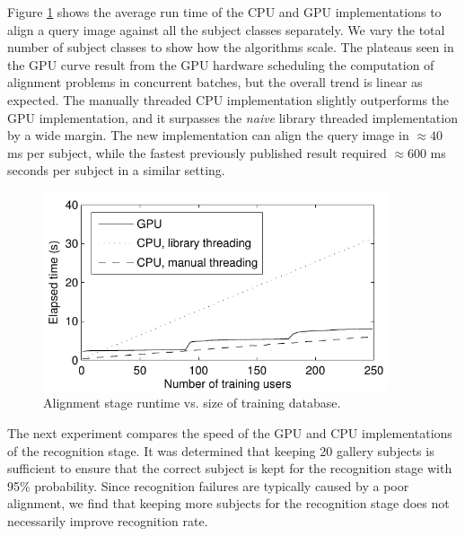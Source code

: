 Figure \ref{fig:alignment_stage_runtime} shows the average run time of the CPU and GPU implementations to align
a query image against all the subject classes separately. We vary the total number of
subject classes to show how the algorithms scale. The plateaus seen in the GPU curve
result from the GPU hardware scheduling the computation of alignment
problems in concurrent batches, but the overall trend is linear as expected.
The manually threaded CPU implementation slightly outperforms the GPU implementation,
and it surpasses the \emph{naive}
library threaded implementation by a wide margin.
The new implementation can align the query
image in $\approx 40$ ms per subject, 
while the fastest previously published result \cite{WagnerA2011-PAMI}
required $\approx 600$ ms seconds per subject in a similar setting.  

\begin{figure}[t!]
\centering
\includegraphics[width=4in]{figures_ijcb/alignment_runtime_graph.pdf}
\caption{Alignment stage runtime vs. size of training database.} 
\label{fig:alignment_stage_runtime}
\end{figure}

The next experiment compares the speed of the GPU and CPU implementations of
the recognition stage.  It was determined that keeping 20 gallery subjects is
sufficient to ensure that the correct subject is kept for the recognition stage
with 95\% probability.  Since recognition failures are typically caused by a
poor alignment, we find that keeping more subjects for the recognition stage does
not necessarily improve recognition rate.


